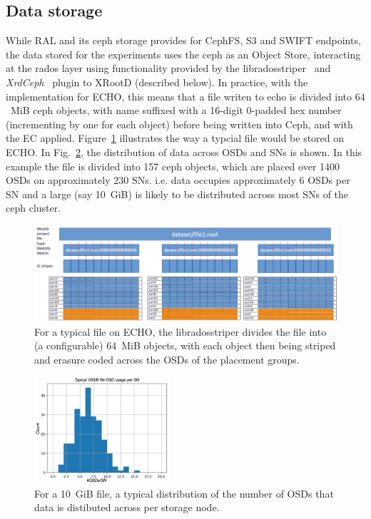 \documentclass{webofc}
\begin{document}
\subsection{Data storage\label{datastore}}
While RAL and its ceph storage provides for CephFS, S3 and SWIFT endpoints, the data stored for the experiments uses the ceph as an Object Store, interacting at the rados layer using functionality provided by the libradosstriper~\cite{libradosstriper} and {\em XrdCeph}~\cite{libradosstriper} plugin to XRootD (described below). 
In practice, with the implementation for ECHO, this means that a file writen to echo is divided into $64$~MiB ceph objects, with name suffixed with a 16-digit 0-padded hex number (incrementing by one for each object) before being written into Ceph, and with the EC applied. Figure~\ref{fig_striper} illustrates the way a typcial file would be stored on ECHO. In Fig.~\ref{fig_osddist}, the distribution of data across OSDs and SNs is shown. In this example the file is divided into 157 ceph objects, which are placed over 1400 OSDs on approximately 230 SNs. i.e. data occupies approximately 6 OSDs per SN and a large (say 10~GiB) is likely to be distributed across most SNs of the ceph cluster. 
%
\begin{figure}[h]
\centering
\includegraphics[width=\textwidth,clip]{figures/radosstriper.pdf}
\caption{For a typical file on ECHO, the libradosstriper divides the file into (a configurable) $64$~MiB objects, with each object then being striped and erasure coded across the OSDs of the placement groups.}
\label{fig_striper}       %
\end{figure}
%
\begin{figure}[h]
     \centering
     \includegraphics[width=5cm,clip]{figures/osds.pdf}
     \caption{For a 10~GiB file, a typical distribution of the number of OSDs that data is distibuted across per storage node.}
     \label{fig_osddist}       %
\end{figure}
\end{document}
